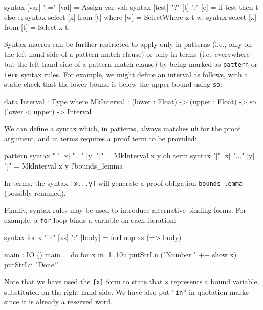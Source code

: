 \begin{code}
syntax [var] ":=" [val]              = Assign var val;
syntax [test] "?" [t] ":" [e]        = if test then t else e;
syntax select [x] from [t] where [w] = SelectWhere x t w;
syntax select [x] from [t]           = Select x t;
\end{code}

\noindent
Syntax macros can be further restricted to apply only in patterns (i.e., only on the left hand side of a pattern match clause) or only in terms (i.e.\ everywhere but the left hand side of a pattern match clause) by being marked as \texttt{pattern} or \texttt{term} syntax rules.
For example, we might define an interval as follows, with a static check that the lower bound is below the upper bound using \texttt{so}:

\begin{code}
data Interval : Type where
   MkInterval : (lower : Float) -> (upper : Float) -> 
                so (lower < upper) -> Interval
\end{code}

\noindent
We can define a syntax which, in patterns, always matches \texttt{oh} for the proof argument, and in terms requires a proof term to be provided:

\begin{code}
pattern syntax "[" [x] "..." [y] "]" = MkInterval x y oh
term    syntax "[" [x] "..." [y] "]" = MkInterval x y ?bounds_lemma
\end{code} 

\noindent
In terms, the syntax \texttt{[x...y]} will generate a proof obligation \texttt{bounds\_lemma} (possibly renamed).

Finally, syntax rules may be used to introduce alternative binding forms.
For example, a \texttt{for} loop binds a variable on each iteration:

\begin{code}
syntax for {x} "in" [xs] ":" [body] = forLoop xs (\x => body)
  
main : IO ()
main = do for x in [1..10]:
              putStrLn ("Number " ++ show x)
          putStrLn "Done!"
\end{code} 

\noindent
Note that we have used the \texttt{\{x\}} form to state that \texttt{x} represents a bound variable, substituted on the right hand side.
We have also put \texttt{"in"} in quotation marks since it is already a reserved word.

